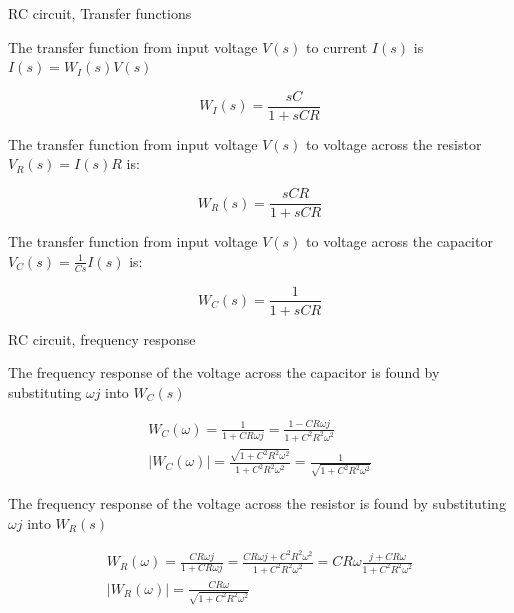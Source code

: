 \documentclass{beamer}
\begin{document}
\begin{frame}{RC circuit, Transfer functions}
	\begin{flushleft}
		
		The transfer function from input voltage $V(s)$ to current $I(s)$ is $I(s) =  W_I(s)V(s)$
		
		\begin{equation}
			W_I(s) = \frac{sC}{1 + sCR}
		\end{equation}
		
		The transfer function from input voltage $V(s)$ to voltage across the resistor $V_R(s) = I(s) R$ is:
		
		\begin{equation}
			W_R(s) = \frac{sCR}{1 + sCR}
		\end{equation}
	
		The transfer function from input voltage $V(s)$ to voltage across the capacitor $V_C(s) = \frac{1}{Cs}I(s)$ is:
	
		\begin{equation}
		W_C(s) = \frac{1}{1 + sCR}
		\end{equation}
		
		
	\end{flushleft}
\end{frame}



\begin{frame}{RC circuit, frequency response}
	\begin{flushleft}
		
		The frequency response of the voltage across the capacitor is found by substituting $\omega j$ into $W_C(s)$
		
		\begin{align}
			W_C(\omega) = \frac{1}{1 + CR\omega j} = \frac{1 - CR\omega j}{1 + C^2 R^2 \omega^2} \\
			| W_C(\omega) | = \frac{\sqrt{1 + C^2 R^2 \omega^2}}{1 + C^2 R^2 \omega^2} 
			= \frac{1}{\sqrt{1 + C^2 R^2 \omega^2}} 
		\end{align}
		
		The frequency response of the voltage across the resistor is found by substituting $\omega j$ into $W_R(s)$
		
		\begin{align*}
			W_R(\omega) = \frac{CR\omega j}{1 + CR\omega j} = \frac{CR\omega j + C^2R^2\omega^2}{1 + C^2 R^2 \omega^2} = CR\omega\frac{ j + CR\omega}{1 + C^2 R^2 \omega^2} \\
			| W_R(\omega) | 
			=  \frac{ CR\omega}{\sqrt{1 + C^2 R^2 \omega^2}} 
		\end{align*}
		
	\end{flushleft}
\end{frame}
\end{document}
